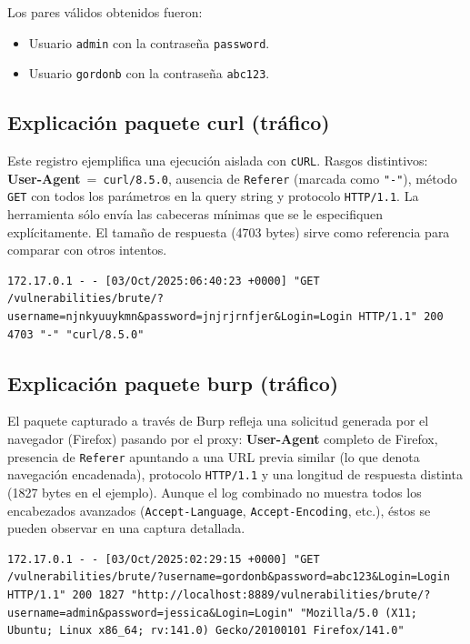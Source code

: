 \documentclass[letterpaper,12pt]{article}
\let\origsubsection\subsection
\renewcommand{\subsection}{\FloatBarrier\origsubsection}
\begin{document}
Los pares válidos obtenidos fueron:
\begin{itemize}
        \item Usuario \texttt{admin} con la contraseña \texttt{password}.
        \item Usuario \texttt{gordonb} con la contraseña \texttt{abc123}.
\end{itemize}


\subsection{Explicación paquete curl (tráfico)}
Este registro ejemplifica una ejecución aislada con \texttt{cURL}. Rasgos distintivos: \textbf{User-Agent}\ =\ \texttt{curl/8.5.0}, ausencia de \texttt{Referer} (marcada como \texttt{"-"}), método \texttt{GET} con todos los parámetros en la query string y protocolo \texttt{HTTP/1.1}. La herramienta sólo envía las cabeceras mínimas que se le especifiquen explícitamente. El tamaño de respuesta (4703 bytes) sirve como referencia para comparar con otros intentos.
\begin{verbatim}
172.17.0.1 - - [03/Oct/2025:06:40:23 +0000] "GET /vulnerabilities/brute/?username=njnkyuuykmn&password=jnjrjrnfjer&Login=Login HTTP/1.1" 200 4703 "-" "curl/8.5.0"
\end{verbatim}
\subsection{Explicación paquete burp (tráfico)}
El paquete capturado a través de Burp refleja una solicitud generada por el navegador (Firefox) pasando por el proxy: \textbf{User-Agent} completo de Firefox, presencia de \texttt{Referer} apuntando a una URL previa similar (lo que denota navegación encadenada), protocolo \texttt{HTTP/1.1} y una longitud de respuesta distinta (1827 bytes en el ejemplo). Aunque el log combinado no muestra todos los encabezados avanzados (\texttt{Accept-Language}, \texttt{Accept-Encoding}, etc.), éstos se pueden observar en una captura detallada.
\begin{verbatim}
172.17.0.1 - - [03/Oct/2025:02:29:15 +0000] "GET /vulnerabilities/brute/?username=gordonb&password=abc123&Login=Login HTTP/1.1" 200 1827 "http://localhost:8889/vulnerabilities/brute/?username=admin&password=jessica&Login=Login" "Mozilla/5.0 (X11; Ubuntu; Linux x86_64; rv:141.0) Gecko/20100101 Firefox/141.0"
\end{verbatim}
\end{document}
